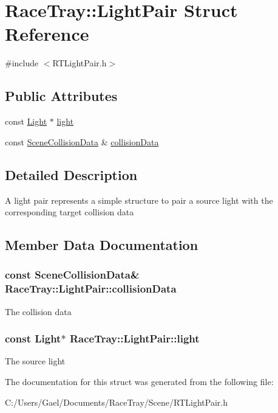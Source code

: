 \hypertarget{struct_race_tray_1_1_light_pair}{\section{Race\-Tray\-:\-:Light\-Pair Struct Reference}
\label{struct_race_tray_1_1_light_pair}
}


{\ttfamily \#include $<$R\-T\-Light\-Pair.\-h$>$}

\subsection*{Public Attributes}
\begin{DoxyCompactItemize}
\item 
const \hyperlink{class_race_tray_1_1_light}{Light} $\ast$ \hyperlink{struct_race_tray_1_1_light_pair_a536616d1337bf266f4f24f31f5b03ec6}{light}
\item 
const \hyperlink{class_race_tray_1_1_scene_collision_data}{Scene\-Collision\-Data} \& \hyperlink{struct_race_tray_1_1_light_pair_aca1fed6768e2eeea4bbdadbc4f7c833b}{collision\-Data}
\end{DoxyCompactItemize}


\subsection{Detailed Description}
A light pair represents a simple structure to pair a source light with the corresponding target collision data 

\subsection{Member Data Documentation}
\hypertarget{struct_race_tray_1_1_light_pair_aca1fed6768e2eeea4bbdadbc4f7c833b}{
\subsubsection[{collision\-Data}]{\setlength{\rightskip}{0pt plus 5cm}const {\bf Scene\-Collision\-Data}\& Race\-Tray\-::\-Light\-Pair\-::collision\-Data}}\label{struct_race_tray_1_1_light_pair_aca1fed6768e2eeea4bbdadbc4f7c833b}
The collision data \hypertarget{struct_race_tray_1_1_light_pair_a536616d1337bf266f4f24f31f5b03ec6}{
\subsubsection[{light}]{\setlength{\rightskip}{0pt plus 5cm}const {\bf Light}$\ast$ Race\-Tray\-::\-Light\-Pair\-::light}}\label{struct_race_tray_1_1_light_pair_a536616d1337bf266f4f24f31f5b03ec6}
The source light 

The documentation for this struct was generated from the following file\-:\begin{DoxyCompactItemize}
\item 
C\-:/\-Users/\-Gael/\-Documents/\-Race\-Tray/\-Scene/R\-T\-Light\-Pair.\-h\end{DoxyCompactItemize}
